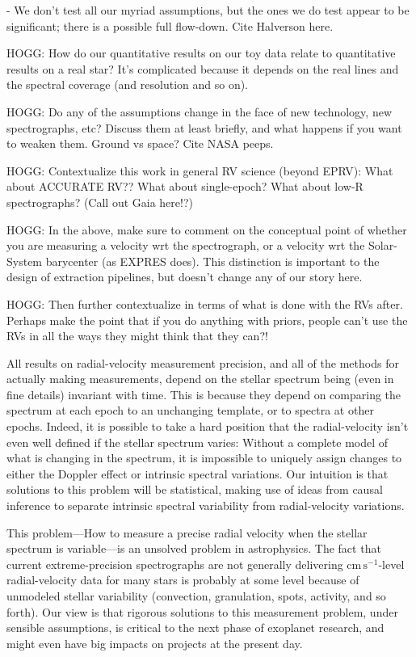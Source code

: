 \documentclass[modern]{aastex631}
\newcommand{\unit}[1]{\mathrm{#1}}
\newcommand{\cm}{\unit{cm}}
\newcommand{\s}{\unit{s}}
\newcommand{\cmps}{\cm\,\s^{-1}}
\begin{document}
- We don't test all our myriad assumptions, but the ones we do test appear to be significant; there is a possible full flow-down. Cite Halverson here.

HOGG: How do our quantitative results on our toy data relate to quantitative results on a real star? It's complicated because it depends on the real lines and the spectral coverage (and resolution and so on).

HOGG: Do any of the assumptions change in the face of new technology, new spectrographs, etc? Discuss them at least briefly, and what happens if you want to weaken them. Ground vs space? Cite NASA peeps.

HOGG: Contextualize this work in general RV science (beyond EPRV): What about ACCURATE RV?? What about single-epoch? What about low-R spectrographs? (Call out Gaia here!?) 

HOGG: In the above, make sure to comment on the conceptual point of whether you are measuring a velocity wrt the spectrograph, or a velocity wrt the Solar-System barycenter (as EXPRES does). This distinction is important to the design of extraction pipelines, but doesn't change any of our story here.

HOGG: Then further contextualize in terms of what is done with the RVs after. Perhaps make the point that if you do anything with priors, people can't use the RVs in all the ways they might think that they can?!

All results on radial-velocity measurement precision, and all of the methods for actually making measurements, depend on the stellar spectrum being (even in fine details) invariant with time.
This is because they depend on comparing the spectrum at each epoch to an unchanging template, or to spectra at other epochs.
Indeed, it is possible to take a hard position that the radial-velocity isn't even well defined if the stellar spectrum varies:
Without a complete model of what is changing in the spectrum, it is impossible to uniquely assign changes to either the Doppler effect or intrinsic spectral variations.
Our intuition is that solutions to this problem will be statistical, making use of ideas from causal inference to separate intrinsic spectral variability from radial-velocity variations.

This problem---How to measure a precise radial velocity when the stellar spectrum is variable---is an unsolved problem in astrophysics.
The fact that current extreme-precision spectrographs are not generally delivering $\cmps$-level radial-velocity data for many stars is probably at some level because of unmodeled stellar variability (convection, granulation, spots, activity, and so forth).
Our view is that rigorous solutions to this measurement problem, under sensible assumptions, is critical to the next phase of exoplanet research, and might even have big impacts on projects at the present day.
\end{document}
